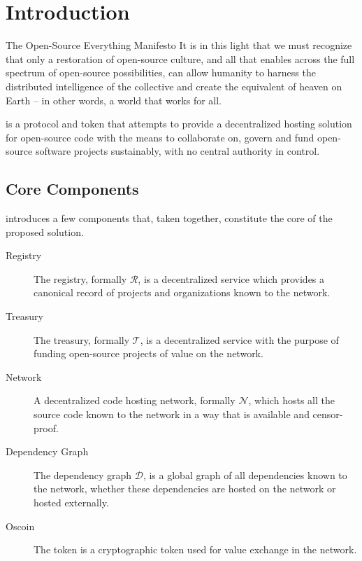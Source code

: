 \section{Introduction}

\begin{epigraph}{The Open-Source Everything Manifesto}
    \noindent It is in this light that we must recognize that only a restoration of
    open-source culture, and all that enables across the full spectrum of
    open-source possibilities, can allow humanity to harness the distributed
    intelligence of the collective and create the equivalent of heaven on Earth
    -- in other words, a world that works for all.
\end{epigraph}

\noindent \oscoin{} is a protocol and token that attempts to provide a decentralized
hosting solution for open-source code with the means to collaborate on, govern
and fund open-source software projects sustainably, with no central authority
in control.

\subsection{Core Components}

\oscoin{} introduces a few components that, taken together, constitute the core
of the proposed solution.

\begin{description}
    \item[Registry] The registry, formally $\mathcal{R}$, is a
        decentralized service which provides a canonical record of projects and
        organizations known to the network.
    \item[Treasury] The treasury, formally $\mathcal{T}$, is a
        decentralized service with the purpose of funding open-source projects
        of value on the network.
    \item[Network] A decentralized code hosting network, formally
        $\mathcal{N}$, which hosts all the source code known to the network
        in a way that is available and censor-proof.
    \item[Dependency Graph] The dependency graph $\mathcal{D}$, is a global
        graph of all dependencies known to the network, whether these
        dependencies are hosted on the network or hosted externally.
    \item[Oscoin] The \oscoin{} token is a cryptographic token used for value
        exchange in the network.
\end{description}

